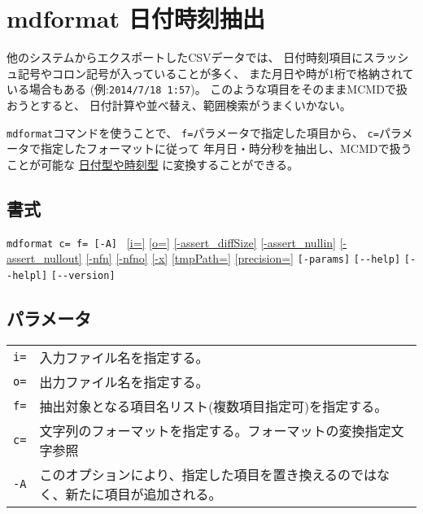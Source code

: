 
%

\section{mdformat 日付時刻抽出\label{sect:mdformat}}

他のシステムからエクスポートしたCSVデータでは、
日付時刻項目にスラッシュ記号やコロン記号が入っていることが多く、
また月日や時が1桁で格納されている場合もある
(例:\verb|2014/7/18 1:57|)。
このような項目をそのままMCMDで扱おうとすると、
日付計算や並べ替え、範囲検索がうまくいかない。

\verb|mdformat|コマンドを使うことで、
\verb|f=|パラメータで指定した項目から、
\verb|c=|パラメータで指定したフォーマットに従って
年月日・時分秒を抽出し、MCMDで扱うことが可能な
\hyperref[sect:datetime]{日付型や時刻型}
に変換することができる。

\subsection*{書式}
\verb|mdformat c= f= [-A] | 
\hyperref[sect:option_i]{[i=]}
\hyperref[sect:option_o]{[o=]}
\hyperref[sect:option_assert_diffSize]{[-assert\_diffSize]}
\hyperref[sect:option_assert_nullin]{[-assert\_nullin]}
\hyperref[sect:option_assert_nullout]{[-assert\_nullout]}
\hyperref[sect:option_nfn]{[-nfn]} 
\hyperref[sect:option_nfno]{[-nfno]}  
\hyperref[sect:option_x]{[-x]}
\hyperref[sect:option_option_tmppath]{[tmpPath=]}
\hyperref[sect:option_precision]{[precision=]}
\verb|[-params]|
\verb|[--help]|
\verb|[--helpl]|
\verb|[--version]|\\

\subsection*{パラメータ}
\begin{table}[htbp]
{\small
\begin{tabular}{ll}
\verb|i=|    & 入力ファイル名を指定する。\\
\verb|o=|    & 出力ファイル名を指定する。\\
\verb|f=|    & 抽出対象となる項目名リスト(複数項目指定可)を指定する。\\
\verb|c=|    & 文字列のフォーマットを指定する。フォーマットの変換指定文字参照 \\
\verb|-A|    & このオプションにより、指定した項目を置き換えるのではなく、新たに項目が追加される。\\
\end{tabular} 
}
\end{table} 

